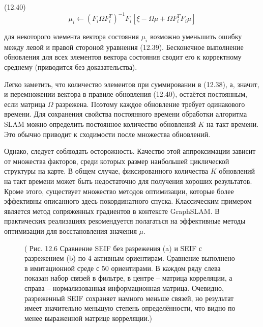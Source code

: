 \documentclass[10pt,a4paper]{article}
\begin{document}
(12.40)
$$\mu_i\longleftarrow(F_i\varOmega F_i^T)^{-1}F_i[\xi-\varOmega\mu+\varOmega F_i^TF_i\mu]$$

для некоторого элемента вектора состояния $\mu_i$ возможно уменьшить ошибку между левой и правой стороной уравнения (12.39). Бесконечное выполнение обновления для всех элементов вектора состояния сводит его к корректному среднему (приводится без доказательства).

Легко заметить, что количество элементов при суммировании в (12.38), а, значит, и перемножении вектора в правиле обновления (12.40), остаётся постоянным, если матрица $\varOmega$ разрежена. Поэтому каждое обновление требует одинакового времени. Для сохранения свойства постоянного времени обработки алгоритма SLAM можно определить постоянное количество обновлений $K$ на такт времени. Это обычно приводит к сходимости после множества обновлений.

Однако, следует соблюдать осторожность. Качество этой аппроксимации зависит от множества факторов, среди которых размер наибольшей циклической структуры на карте. В общем случае, фиксированного количества $K$ обновлений на такт времени может быть недостаточно для получения хороших результатов. Кроме этого, существует множество методов оптимизации, которые более эффективны описанного здесь покординатного спуска. Классическим примером является метод сопряженных градиентов в контексте GraphSLAM. В практических реализациях рекомендуется полагаться на эффективные методы оптимизации для восстановления значения $\mu$.

\begin{figure}[H]
	\caption{ ( Рис. 12.6 Сравнение SEIF без разрежения (a) и SEIF с разрежением (b) по 4 активным ориентирам. Сравнение выполнено в имитационной среде с 50 ориентирами. В каждом ряду слева показан набор связей в фильтре, в центре – матрица корреляции, а справа – нормализованная информационная матрица. Очевидно, разреженный SEIF сохраняет намного меньше связей, но результат имеет значительно меньшую степень определённости, что видно по менее выраженной матрице корреляции.) }
	\label{fig:126orig}
\end{figure}
\end{document}
